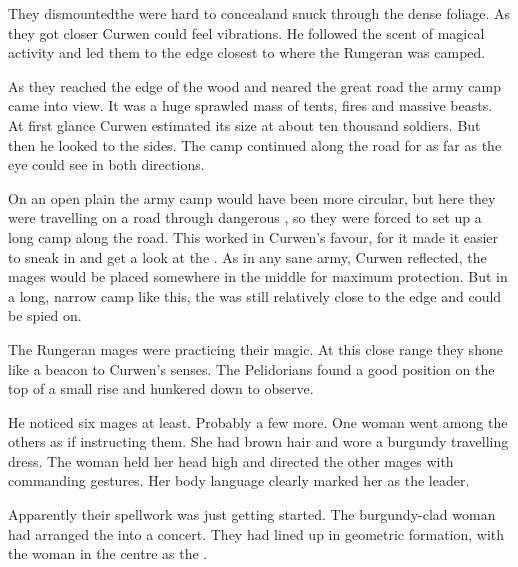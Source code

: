 They dismounted\dash the \relcs{} were hard to conceal\dash and snuck through the dense foliage. 
As they got closer Curwen could feel vibrations. 
He followed the scent of magical activity and led them to the edge closest to where the Rungeran \ishrah{} was camped. 

As they reached the edge of the wood and neared the great road the army camp came into view. 
It was a huge sprawled mass of tents, fires and massive beasts. 
At first glance Curwen estimated its size at about ten thousand soldiers. 
But then he looked to the sides. 
The camp continued along the road for as far as the eye could see in both directions. 


On an open plain the army camp would have been more circular, but here they were travelling on a road through dangerous \Wylde{}, so they were forced to set up a long camp along the road. 
This worked in Curwen's favour, for it made it easier to sneak in and get a look at the \ishrah. 
As in any sane army, Curwen reflected, the mages would be placed somewhere in the middle for maximum protection. 
But in a long, narrow camp like this, the  was still relatively close to the edge and could be spied on. 

The Rungeran mages were practicing their magic. 
At this close range they shone like a beacon to Curwen's senses. 
The Pelidorians found a good position on the top of a small rise and hunkered down to observe. 

He noticed six mages at least. 
Probably a few more. 
One woman went among the others as if instructing them. 
She had brown hair and wore a burgundy travelling dress. 
The woman held her head high and directed the other mages with commanding gestures. 
Her body language clearly marked her as the \ishrah{} leader. 


Apparently their spellwork was just getting started. 
The burgundy-clad woman had arranged the \ishrah{} into a concert. 
They had lined up in geometric formation, with the woman in the centre as the \apex. 

